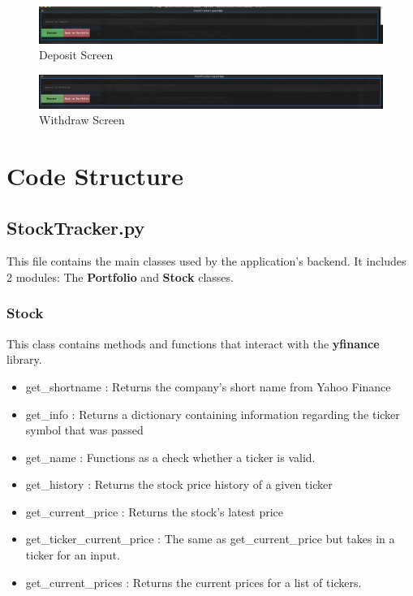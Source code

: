 \documentclass{article}
\begin{document}
\begin{figure}
    \centering
    \includegraphics[width=1\linewidth]{Deposit.png}
    \caption{Deposit Screen}
    \label{fig:6}
\end{figure}

\begin{figure}
    \centering
    \includegraphics[width=1\linewidth]{Withdraw.png}
    \caption{Withdraw Screen}
    \label{fig:7}
\end{figure}

\section{Code Structure}

\subsection{StockTracker.py}
This file contains the main classes used by the application's backend. It includes 2 modules: The \textbf{Portfolio} and \textbf{Stock} classes.

\subsubsection{Stock}
This class contains methods and functions that interact with the \textbf{yfinance} library.
\begin{itemize}
    \item get{\_}shortname : Returns the company's short name from Yahoo Finance
    \item get{\_}info : Returns a dictionary containing information regarding the ticker symbol that was passed
    \item get{\_}name : Functions as a check whether a ticker is valid. 
    \item get{\_}history : Returns the stock price history of a given ticker
    \item get{{\_}}current_price : Returns the stock's latest price
    \item get{\_}ticker_current_price : The same as get_current_price but takes in a ticker for an input.
    \item get{{\_}}current{{\_}}prices : Returns the current prices for a list of tickers. 
\end{itemize}
\end{document}
